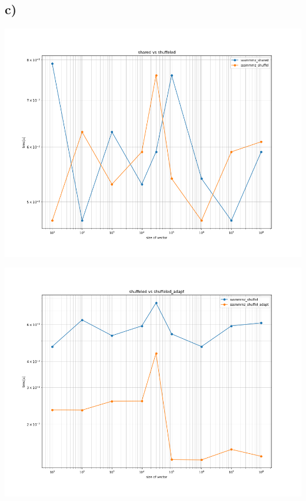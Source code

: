 \documentclass[11pt,a4paper]{article}
\begin{document}
\subsection*{c)}
\begin{center}
	
	\begin{minipage}[t]{0.49\textwidth}
		\includegraphics[width=\textwidth]{Bilder/shared_vs_shuffeled}
	\end{minipage}
	\begin{minipage}[t]{0.49\textwidth}
	\includegraphics[width=\textwidth]{Bilder/shuffeled_vs_shuffeled_adapt}
	\end{minipage}
	
\end{center}
\end{document}

